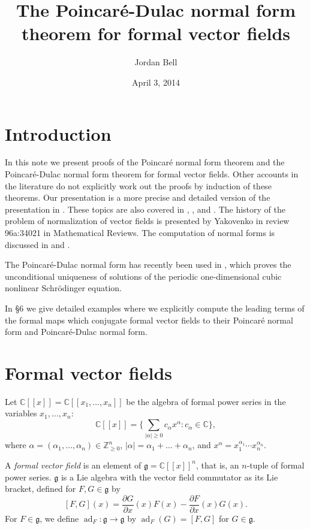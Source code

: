 \documentclass{article}
\newcommand{\ad}{\operatorname{ad}}
\begin{document}
\title{The Poincar\'e-Dulac normal form theorem for formal vector fields}
\author{Jordan Bell}

\date{April 3, 2014}       
\maketitle       


\section{Introduction}
In this note we present proofs of the Poincar\'e normal form theorem and the Poincar\'e-Dulac normal form theorem for
formal vector fields. Other accounts in the literature do not explicitly work out the proofs by induction of these theorems. 
Our presentation is a more precise and detailed version of the presentation in \cite[\S \S 3--5]{analytic}. These topics are also covered in \cite[\S I.3]{encyclopedia}, \cite[Chapter 5]{arnold1988}, and \cite[\S A.5]{poisson}.
The history of the problem
of normalization of vector fields is presented by Yakovenko in review 96a:34021 in Mathematical Reviews. The computation of normal forms is discussed in \cite{scheurle} and \cite[Chapter 19]{wiggins}.

The Poincar\'e-Dulac normal form has recently been used in \cite{unconditional}, which proves the
unconditional uniqueness of solutions of the periodic one-dimensional cubic nonlinear Schr\"odinger equation.

In \S 6 we give detailed examples where we explicitly compute the leading terms of the formal maps which conjugate formal
vector fields to their Poincar\'e normal form and Poincar\'e-Dulac normal form.

\section{Formal vector fields}
Let $\mathbb{C}[[x]]=\mathbb{C}[[x_1,\ldots,x_n]]$ be the algebra of  formal power series in the variables $x_1,\ldots,x_n$: 
\[
\mathbb{C}[[x]]=\bigg \{\sum_{|\alpha| \geq 0} c_\alpha x^\alpha : c_\alpha \in \mathbb{C} \bigg\},
\]
where $\alpha=(\alpha_1,\ldots,\alpha_n) \in \mathbb{Z}^n_{\geq 0}$, $|\alpha|=\alpha_1 + \ldots +\alpha_n$, and
$x^\alpha=x_1^{\alpha_1} \cdots x_n^{\alpha_n}$.

A {\em formal vector field} is an element of $\mathfrak{g}=\mathbb{C}[[x]]^n$, that is, an $n$-tuple of formal power series.
$\mathfrak{g}$ is a Lie algebra with the vector field commutator as its Lie bracket, defined for $F,G \in \mathfrak{g}$ by
\[
[F,G](x)=\frac{\partial G}{\partial x}(x) F(x)-\frac{\partial F}{\partial x}(x) G(x).
\]
For $F \in \mathfrak{g}$, we define $\ad_F:\mathfrak{g} \to \mathfrak{g}$ by $\ad_F(G)=[F,G]$ for $G \in \mathfrak{g}$. 
\end{document}
